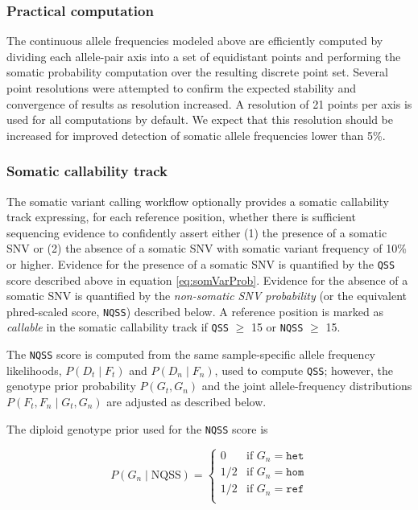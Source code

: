 \documentclass{article}
\begin{document}

\subsubsection{Practical computation}

The continuous allele frequencies modeled above are efficiently computed by dividing each allele-pair axis into a set of equidistant points and performing the somatic probability computation over the resulting discrete point set. Several point resolutions were attempted to confirm the expected stability and convergence of results as resolution increased. A resolution of 21 points per axis is used for all computations by default. We expect that this resolution should be increased for improved detection of somatic allele frequencies lower than 5\%.

\subsubsection{Somatic callability track}

The somatic variant calling workflow optionally provides a somatic callability track expressing, for each reference position, whether there is sufficient sequencing evidence to confidently assert either (1) the presence of a somatic SNV or (2) the absence of a somatic SNV with somatic variant frequency of 10\% or higher. Evidence for the presence of a somatic SNV is quantified by the \texttt{QSS} score described above in equation \ref{eq:somVarProb}. Evidence for the absence of a somatic SNV is quantified by the \emph{non-somatic SNV probability} (or the equivalent phred-scaled score, \texttt{NQSS}) described below. A reference position is marked as \emph{callable} in the somatic callability track if \texttt{QSS} $\ge$ 15 or \texttt{NQSS} $\ge$ 15.

The \texttt{NQSS} score is computed from the same sample-specific allele frequency likelihoods, $P(D_t \mid F_t)$ and $P(D_n \mid F_n)$, used to compute \texttt{QSS}; however, the genotype prior probability $P(G_t, G_n)$ and the joint allele-frequency distributions $P(F_t,F_n \mid G_t,G_n)$ are adjusted as described below.

The diploid genotype prior used for the \texttt{NQSS} score is

\begin{equation*}
P(G_n\mid \text{NQSS})=
\begin{cases}
0 & \text{if } G_n = \texttt{het} \\
1/2 & \text{if } G_n = \texttt{hom} \\
1/2 & \text{if } G_n = \texttt{ref} \\
\end{cases}
\end{equation*}
\end{document}

